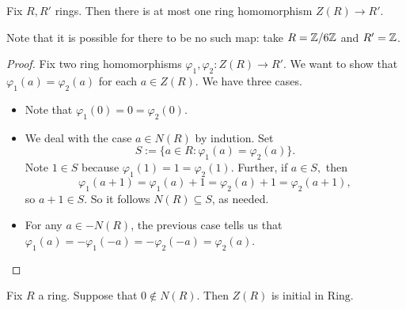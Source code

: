 \documentclass{article}
\begin{document}
\begin{lemma} \label{lem:atmostone}
	Fix $R,R'$ rings. Then there is at most one ring homomorphism $Z(R)\to R'.$
\end{lemma}
Note that it is possible for there to be no such map: take $R=\mathbb Z/6\mathbb Z$ and $R'=\mathbb Z$.
\begin{proof}
	Fix two ring homomorphisms $\varphi_1,\varphi_2:Z(R)\to R'.$ We want to show that $\varphi_1(a)=\varphi_2(a)$ for each $a\in Z(R).$ We have three cases.
	\begin{itemize}
		\item Note that $\varphi_1(0)=0=\varphi_2(0)$.
		\item We deal with the case $a\in N(R)$ by indution. Set
		\[S:=\{a\in R:\varphi_1(a)=\varphi_2(a)\}.\]
		Note $1\in S$ because $\varphi_1(1)=1=\varphi_2(1).$ Further, if $a\in S,$ then
		\[\varphi_1(a+1)=\varphi_1(a)+1=\varphi_2(a)+1=\varphi_2(a+1),\]
		so $a+1\in S$. So it follows $N(R)\subseteq S$, as needed.
		\item For any $a\in-N(R)$, the previous case tells us that $\varphi_1(a)=-\varphi_1(-a)=-\varphi_2(-a)=\varphi_2(a)$.
		\qedhere
	\end{itemize}
\end{proof}
\begin{proposition} \label{prop:trichimpliesinitial}
	Fix $R$ a ring. Suppose that $0\notin N(R)$. Then $Z(R)$ is initial in $\mathrm{Ring}$.
\end{proposition}
\end{document}

